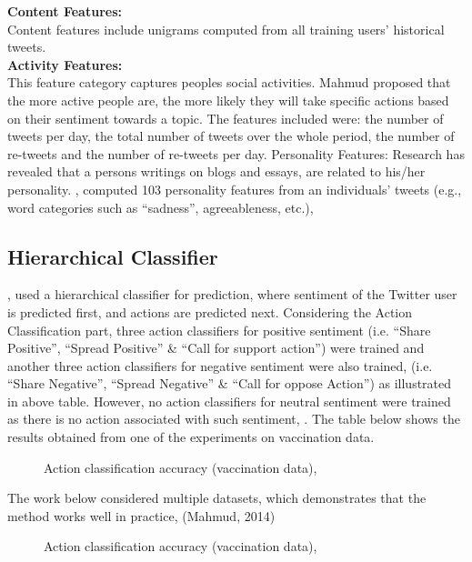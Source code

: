 \textbf{Content Features:} \\
Content features include unigrams computed from all training users' historical tweets.\\
\textbf{Activity Features:}\\
This feature category captures people\textquotesingle s social activities. Mahmud proposed that the more active people are, the more likely they will take specific actions based on their sentiment
towards a topic. The features included were: the number of tweets per day, the total number of tweets over the whole period, the number of re-tweets and the number of re-tweets per day. Personality Features: Research has revealed that a persons writings on blogs and essays, are related to his/her personality. \cite{ref38}, computed 103 personality features from an individuals' tweets (e.g., word categories such as “sadness”, agreeableness, etc.),
\leavevmode\\

\subsection{Hierarchical Classifier}
\cite{ref38}, used a hierarchical classifier for prediction, where sentiment of the Twitter user
is predicted first, and actions are predicted next. Considering the Action Classification part, three
action classifiers for positive sentiment (i.e. “Share Positive”, “Spread Positive” \& “Call for
support action”) were trained and another three action classifiers for negative sentiment were also
trained, (i.e. “Share Negative”, “Spread Negative” \& “Call for oppose Action”) as illustrated in
above table. However, no action classifiers for neutral sentiment were trained as there is no action
associated with such sentiment, \cite{ref38}. The table below shows the results obtained from
one of the experiments on vaccination data.


\begin{figure}[h]
  \centering
  \caption[Action classification]%
  {Action classification accuracy (vaccination data), \cite{ref38}}
  \label{fig:ALAP:sm1}
\end{figure}


The work below considered multiple datasets, which demonstrates that the method works well in
practice, (Mahmud, 2014)

\begin{figure}[h]
  \centering
  \caption[Action classification on multiple data sets]%
  {Action classification accuracy (vaccination data), \cite{ref38}}
  \label{fig:ALAP:sm1}
\end{figure}



